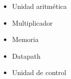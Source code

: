 \begin{frame}
\begin{columns}[T]
  \end{columns}
  
  \begin{columns}[T]
  \begin{column}{.2\textwidth}
  \end{column}
  \begin{column}{.6\textwidth}
  \begin{center} 
    \begin{itemize}
      \item<2-> Unidad aritmética
      \item<3-> Multiplicador
      \item<4-> Memoria
      \item<5-> Datapath
      \item<6-> Unidad de control
    \end{itemize}
  \end{center}
  \end{column}
  \begin{column}{.2\textwidth}
  \end{column}
  \end{columns}
\end{frame}

